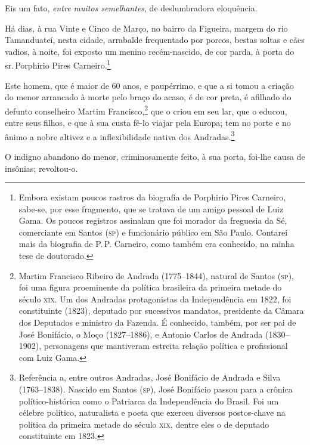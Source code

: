 Eis um fato, \emph{entre muitos semelhantes}, de deslumbradora
eloquência.

Há dias, à rua Vinte e Cinco de Março, no bairro da Figueira, margem do
rio Tamanduateí, nesta cidade, arrabalde frequentado por porcos, bestas
soltas e cães vadios, à noite, foi exposto um menino recém-nascido, de
cor parda, à porta do sr.\,Porphirio Pires Carneiro.\footnote{Embora
  existam poucos rastros da biografia de Porphirio Pires Carneiro,
  sabe-se, por esse fragmento, que se tratava de um amigo pessoal de
  Luiz Gama. Os poucos registros assinalam que foi morador da
  freguesia da Sé, comerciante em Santos (\textsc{sp}) e funcionário público em
  São Paulo. Contarei mais da biografia de P.\,P. Carneiro, como também
  era conhecido, na minha tese de doutorado.} %

Este homem, que é maior de 60 anos, e paupérrimo, e que a si tomou a
criação do menor arrancado à morte pelo braço do acaso, é de cor preta,
é afilhado do defunto conselheiro Martim Francisco,\footnote{Martim
  Francisco Ribeiro de Andrada (1775--1844), natural de Santos (\textsc{sp}), foi
  uma figura proeminente da política brasileira da primeira metade do
  século \textsc{xix}. Um dos Andradas protagonistas da Independência em 1822,
  foi constituinte (1823), deputado por sucessivos mandatos, presidente
  da Câmara dos Deputados e ministro da Fazenda. É conhecido, também,
  por ser pai de José Bonifácio, o Moço (1827--1886), e Antonio Carlos de
  Andrada (1830--1902), personagens que mantiveram estreita relação
  política e profissional com Luiz Gama.} que o criou em seu lar, que o
educou, entre seus filhos, e que à sua custa fê-lo viajar pela Europa;
tem no porte e no ânimo a nobre altivez e a inflexibilidade nativa dos
Andradas.\footnote{Referência a, entre outros Andradas, José Bonifácio
  de Andrada e Silva (1763--1838). Nascido em Santos (\textsc{sp}), José Bonifácio
  passou para a crônica político-histórica como o Patriarca da
  Independência do Brasil. Foi um célebre político, naturalista e poeta
  que exerceu diversos postos-chave na política da primeira metade do
  século \textsc{xix}, dentre eles o de deputado constituinte em 1823.}

O indigno abandono do menor, criminosamente feito, à sua porta, foi-lhe
causa de insônias; revoltou-o.

